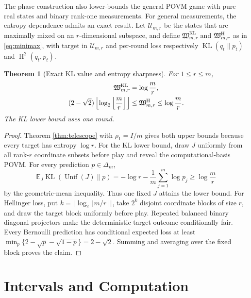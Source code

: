 \documentclass[twoside]{article}
\newtheorem{theorem}{Theorem}
\newcommand{\KL}{\operatorname{KL}}
\newcommand{\Hsq}{\operatorname{H}^2}
\begin{document}
The phase construction also lower-bounds the general POVM game with pure real states and binary rank-one measurements. For general measurements, the entropy dependence admits an exact result. Let $\mathcal U_{m,r}$ be the states that are maximally mixed on an $r$-dimensional subspace, and define $\mathfrak W^{\KL}_{m,r}$ and $\mathfrak W^{\rm H}_{m,r}$ as in \eqref{eq:minimax}, with target in $\mathcal U_{m,r}$ and per-round loss respectively $\KL(q_t\|p_t)$ and $\Hsq(q_t,p_t)$.

\begin{theorem}[Exact KL value and entropy sharpness]
\label{thm:rank-minimax}
For $1\leq r\leq m$,
\begin{equation}
\begin{aligned}
\mathfrak W^{\KL}_{m,r}&=\log\frac mr,\\
(2-\sqrt2)\left\lfloor\log_2\left\lfloor\frac mr\right\rfloor\right\rfloor
&\leq\mathfrak W^{\rm H}_{m,r}\leq\log\frac mr.
\end{aligned}
\label{eq:rank-minimax}
\end{equation}
The KL lower bound uses one round.
\end{theorem}

\begin{proof}
Theorem \ref{thm:telescope} with $\rho_1=I/m$ gives both upper bounds because every target has entropy $\log r$. For the KL lower bound, draw $J$ uniformly from all rank-$r$ coordinate subsets before play and reveal the computational-basis POVM. For every prediction $p\in\Delta_m$,
\begin{equation}
\mathbb E_J\KL(\operatorname{Unif}(J)\|p)=-\log r-\frac1m\sum_{j=1}^m\log p_j\geq\log\frac mr
\end{equation}
by the geometric-mean inequality. Thus one fixed $J$ attains the lower bound. For Hellinger loss, put $k=\lfloor\log_2\lfloor m/r\rfloor\rfloor$, take $2^k$ disjoint coordinate blocks of size $r$, and draw the target block uniformly before play. Repeated balanced binary diagonal projectors make the deterministic target outcome conditionally fair. Every Bernoulli prediction has conditional expected loss at least $\min_p\{2-\sqrt p-\sqrt{1-p}\}=2-\sqrt2$. Summing and averaging over the fixed block proves the claim.
\end{proof}

\section{Intervals and Computation}
\label{sec:robust}
\end{document}
